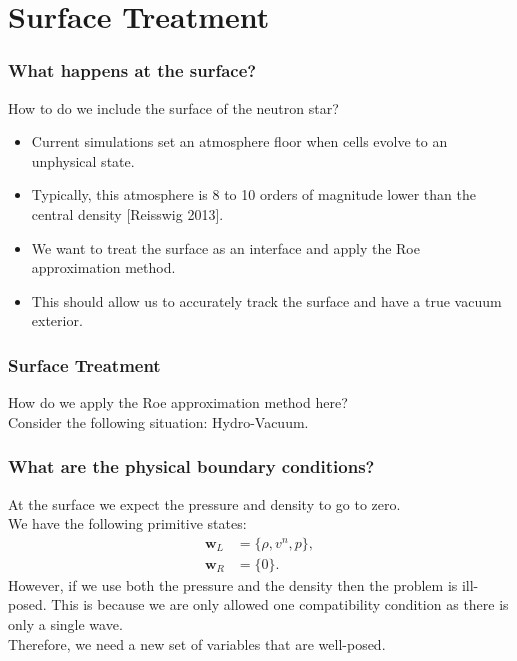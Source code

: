 \documentclass{beamer}
\begin{document}
\section{Surface Treatment}
\begin{frame}
\frametitle{What happens at the surface?}
How to do we include the surface of the neutron star?
\begin{itemize}
\item{Current simulations set an atmosphere floor when cells evolve to an unphysical state.}
\item{Typically, this atmosphere is 8 to 10 orders of magnitude lower than the central density [Reisswig 2013].}
\item{We want to treat the surface as an interface and apply the Roe approximation method.}
\item{This should allow us to accurately track the surface and have a true vacuum exterior.}
\end{itemize}
\end{frame}

\begin{frame}
\frametitle{Surface Treatment}
How do we apply the Roe approximation method here?\\
Consider the following situation: Hydro-Vacuum.\\
\centering
\raggedright
\end{frame}

\begin{frame}
\frametitle{What are the physical boundary conditions?}
At the surface we expect the pressure and density to go to zero. \\
We have the following primitive states:
\begin{align}
\mathbf{w}_L &= \{\rho, v^n, p\},\\
\mathbf{w}_R&=\{0\}.
\end{align}
However, if we use both the pressure and the density then the problem is ill-posed. This is because we are only allowed one compatibility condition as there is only a single wave. \\
Therefore, we need a new set of variables that are well-posed.
\end{frame}
\end{document}

